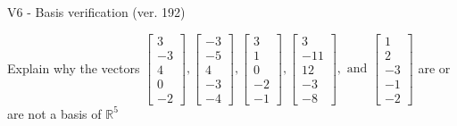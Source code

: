 \begin{exercise}
  \begin{exerciseTitle}V6 - Basis verification (ver. 192)\end{exerciseTitle}
  \begin{exerciseStatement}
    Explain why the vectors \(\left[\begin{array}{r}
3 \\
-3 \\
4 \\
0 \\
-2
\end{array}\right] , \left[\begin{array}{r}
-3 \\
-5 \\
4 \\
-3 \\
-4
\end{array}\right] , \left[\begin{array}{r}
3 \\
1 \\
0 \\
-2 \\
-1
\end{array}\right] , \left[\begin{array}{r}
3 \\
-11 \\
12 \\
-3 \\
-8
\end{array}\right] , \text{ and } \left[\begin{array}{r}
1 \\
2 \\
-3 \\
-1 \\
-2
\end{array}\right]\) are or are not a basis of \(\mathbb{R}^5\)	



\end{exerciseStatement}
\end{exercise}
